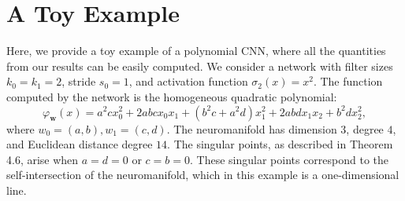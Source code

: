 \documentclass[twoside]{article}
\theoremstyle{plain}%
\theoremstyle{definition}
\theoremstyle{remark}
\begin{document}
\section{A Toy Example}\label{sec:toyexmp}
Here, we provide a toy example of a polynomial CNN, where all the quantities from our results can be easily computed. We consider a network with filter sizes $k_0 = k_1 = 2$, stride $s_0 = 1$, and activation function $\sigma_2(x) = x^2$. The function computed by the network is the homogeneous quadratic polynomial:
\begin{equation}
\varphi_\mathbf{w}(x)= a^2 c x_0^2 + 2abc x_0 x_1 + (b^2 c + a^2 d)x_1^2 + 2abd x_1 x_2 + b^2 d x_2^2,
\end{equation} 
where $w_0 = (a,b), w_1 = (c,d)$. The neuromanifold has dimension $3$, degree $4$, and Euclidean distance degree $14$. The singular points, as described in Theorem 4.6, arise when $a=d=0$ or $c=b=0$. These singular points correspond to the self-intersection of the neuromanifold, which in this example is a one-dimensional line.




  
\end{document}
